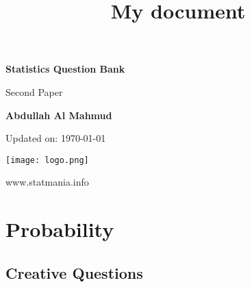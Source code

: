 \documentclass[a4paper,oneside, margin=1.4in]{book}
\title{My document}
\begin{document}
\frontmatter

\begin{titlepage}
    \begin{center}
        \vspace*{1cm}
            
        \Huge
        \textbf{Statistics Question Bank}
            
        \vspace{0.5cm}
        \huge
        Second Paper
            
        \vspace{1.5cm}
            
        \textbf{Abdullah Al Mahmud}

     \vspace{1.5cm}

	\Large 
	Updated on: \today
            
        \vfill
            

            
        \vspace{0.8cm}
            
\texttt{[image: logo.png]}
            
        \Large
        www.statmania.info\\
            
    \end{center}
\end{titlepage}


\tableofcontents


\mainmatter
\chapter{Probability} 
\section{Creative Questions}
\end{document}
